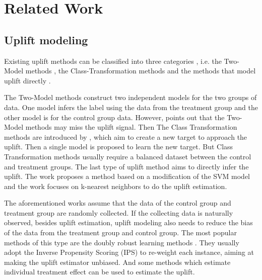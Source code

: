 
\section{Related Work}
\subsection{Uplift modeling} \label{sec:uplift_model}
Existing uplift methods can be classified into three categories \cite{gutierrez2017causal}, i.e. the Two-Model methods \cite{radcliffe2007using,nassif2013uplift}, the Class-Transformation methods \cite{jaskowski2012uplift} and the methods that model uplift directly \cite{radcliffe2011real,rzepakowski2012decision,soltys2015ensemble}. 

The Two-Model methods construct two independent models for the two groups of data. One model infers the label using the data from the treatment group and the other model is for the control group data. However, \cite{radcliffe2011real} points out that the Two-Model methods may miss the uplift signal. Then The Class Transformation methods are introduced by \cite{jaskowski2012uplift,athey2015machine}, which aim to create a new target to approach the uplift. Then a single model is proposed to learn the new target. But Class Transformation methods usually require a balanced dataset between the control and treatment groups. The last type of uplift method aims to directly infer the uplift. The work \cite{zaniewicz2013support} proposes a method based on a modification of the SVM model and the work \cite{guelman2014optimal} focuses on k-nearest neighbors to do the uplift estimation. 

The aforementioned works assume that the data of the control group and treatment group are randomly collected. If the collecting data is naturally observed, besides uplift estimation, uplift modeling also needs to reduce the bias of the data from the treatment group and control group. The most popular methods of this type are the doubly robust learning methods \cite{emsley2008implementing,zhao2015doubly,jung2021estimating,chernozhukov2018double}. They usually adopt the Inverse Propensity Scoring (IPS) \cite{hirano2003efficient,kitagawa2018should} to re-weight each instance, aiming at making the uplift estimator unbiased. And some methods\cite{louizos2017causal,shalit2017estimating} which estimate individual treatment effect can be used to estimate the uplift.


